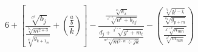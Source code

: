 \documentclass[11 pt]{beamer}
\begin{document}
\begin{frame}
\begin{Large}
$$ 6+\left[\frac{\sqrt[c^d]{b_j}}{\frac{\sqrt[b_x]{m^{2+3}}}{\sqrt[w]{g_{{k+1}_m}}}}+\left(\frac{\frac{a}{b}}{k}  \right)\right]-\frac{\frac{\sqrt[x_l]{k_x}}{\sqrt[s^{{k-l}_j}]{n^c+b_{hj}}}}{\frac{d_j+\sqrt[g^{h+m}]{g^2+m_l}} {\sqrt[m^{k\div j}] {m^{2\cdot n}\div jk}}} -\left( \frac{\frac{\sqrt[c_k]{k^{l-j_i}}}{\sqrt[n_k]{g_{p+m}}}}{\frac{\sqrt[h^{x+2}]{n_{mn}}}{\sqrt[k^t]{m_{nm}}}} \right) $$
\end{Large}
\end{frame}
\end{document}
